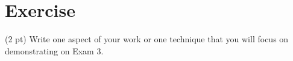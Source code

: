 %
%
\section{Exercise}

(2 pt) Write one aspect of your work or one technique that you will focus on demonstrating on Exam 3.